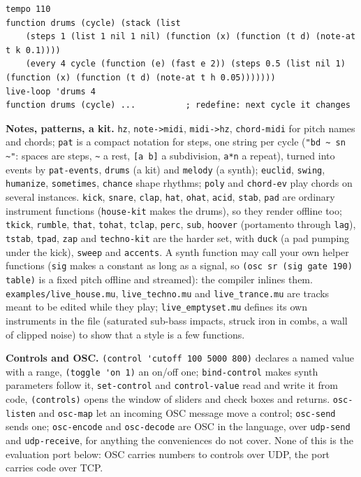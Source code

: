 \documentclass[11pt,a4paper]{article}
\newcommand{\musil}[1]{\lstinline[style=musilinline]{#1}}
\begin{document}
\begin{lstlisting}
tempo 110
function drums (cycle) (stack (list
    (steps 1 (list 1 nil 1 nil) (function (x) (function (t d) (note-at t k 0.1))))
    (every 4 cycle (function (e) (fast e 2)) (steps 0.5 (list nil 1) (function (x) (function (t d) (note-at t h 0.05)))))))
live-loop 'drums 4
function drums (cycle) ...          ; redefine: next cycle it changes
\end{lstlisting}

\textbf{Notes, patterns, a kit.} \musil{hz}, \musil{note->midi}, \musil{midi->hz},
\musil{chord-midi} for pitch names and chords; \musil{pat} is a compact notation for steps,
one string per cycle (\musil{"bd ~ sn ~"}: spaces are steps, \texttt{\textasciitilde} a rest,
\texttt{[a b]} a subdivision, \texttt{a*n} a repeat), turned into events by
\musil{pat-events}, \musil{drums} (a kit) and \musil{melody} (a synth); \musil{euclid},
\musil{swing}, \musil{humanize}, \musil{sometimes}, \musil{chance} shape rhythms;
\musil{poly} and \musil{chord-ev} play chords on several instances. \musil{kick},
\musil{snare}, \musil{clap}, \musil{hat}, \musil{ohat}, \musil{acid}, \musil{stab},
\musil{pad} are ordinary instrument functions (\musil{house-kit} makes the drums), so
they render offline too; \musil{tkick}, \musil{rumble}, \musil{that}, \musil{tohat},
\musil{tclap}, \musil{perc}, \musil{sub}, \musil{hoover} (portamento through \musil{lag}),
\musil{tstab}, \musil{tpad}, \musil{zap} and \musil{techno-kit} are the harder set, with
\musil{duck} (a pad pumping under the kick), \musil{sweep} and \musil{accents}. A synth
function may call your own helper functions (\musil{sig} makes a constant as long as a
signal, so \musil{(osc sr (sig gate 190) table)} is a fixed pitch offline and streamed):
the compiler inlines them. \texttt{examples/live\_house.mu}, \texttt{live\_techno.mu} and \texttt{live\_trance.mu} are
tracks meant to be edited while they play; \texttt{live\_emptyset.mu} defines its own instruments in the file
(saturated sub-bass impacts, struck iron in combs, a wall of clipped noise) to show that a style is a few functions.

\textbf{Controls and OSC.} \musil{(control 'cutoff 100 5000 800)} declares a named value
with a range, \musil{(toggle 'on 1)} an on/off one; \musil{bind-control} makes synth
parameters follow it, \musil{set-control} and \musil{control-value} read and write it from
code, \musil{(controls)} opens the window of sliders and check boxes and returns. \musil{osc-listen} and
\musil{osc-map} let an incoming OSC message move a control; \musil{osc-send} sends one;
\musil{osc-encode} and \musil{osc-decode} are OSC in the language, over \musil{udp-send}
and \musil{udp-receive}, for anything the conveniences do not cover. None of this is the
evaluation port below: OSC carries numbers to controls over UDP, the port carries code
over TCP.
\end{document}
